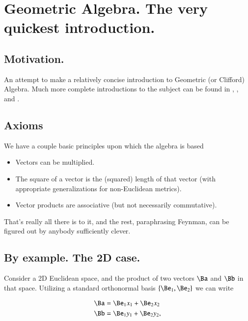 %
%

\chapter{Geometric Algebra.  The very quickest introduction.}
\label{chap:gaQuickIntro}
{}
\date{Mar 16, 2012}

\beginArtWithToc

\section{Motivation.}

An attempt to make a relatively concise introduction to Geometric (or Clifford) Algebra.  Much more complete introductions to the subject can be found in \cite{dorst2007gac}, \cite{doran2003gap}, and \cite{hestenes1999nfc}.

\section{Axioms}

We have a couple basic principles upon which the algebra is based

\begin{itemize}
\item Vectors can be multiplied.
\item The square of a vector is the (squared) length of that vector (with appropriate generalizations for non-Euclidean metrics).
\item Vector products are associative (but not necessarily commutative).
\end{itemize}

That's really all there is to it, and the rest, paraphrasing Feynman, can be figured out by anybody sufficiently clever.

\section{By example.  The 2D case.}

Consider a 2D Euclidean space, and the product of two vectors $\Ba$ and $\Bb$ in that space.  Utilizing a standard orthonormal basis $\{\Be_1, \Be_2\}$ we can write

\begin{align}\label{eqn:gaQuickIntro:10}
\Ba &= \Be_1 x_1 + \Be_2 x_2 \\
\Bb &= \Be_1 y_1 + \Be_2 y_2,
\end{align}

